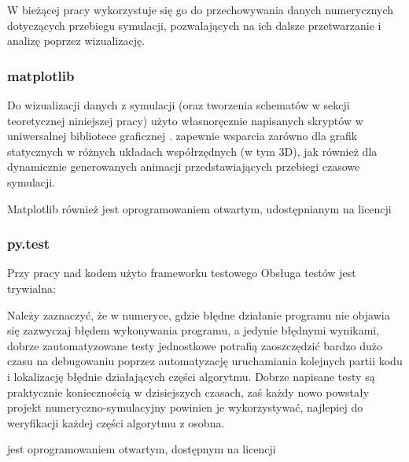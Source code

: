    W bieżącej pracy wykorzystuje się go do przechowywania danych numerycznych dotyczących
    przebiegu symulacji, pozwalających na ich dalsze przetwarzanie i analizę poprzez
    wizualizację.

    \subsubsection{matplotlib}
    Do wizualizacji danych z symulacji
    (oraz tworzenia schematów w sekcji teoretycznej niniejszej pracy)
    użyto własnoręcznie napisanych skryptów w uniwersalnej bibliotece graficznej
    .  zapewnie wsparcia zarówno
    dla grafik statycznych w różnych układach współrzędnych (w tym 3D), jak również dla
    dynamicznie generowanych animacji przedstawiających przebiegi czasowe symulacji.

    Matplotlib również jest oprogramowaniem otwartym, udostępnianym na licencji

    \subsubsection{py.test}
    Przy pracy nad kodem użyto frameworku testowego  
    Obsługa testów jest trywialna:


    Należy zaznaczyć, że w numeryce, gdzie błędne działanie programu nie objawia się
    zazwyczaj błędem wykonywania programu, a jedynie błędnymi wynikami, dobrze zautomatyzowane
    testy jednostkowe potrafią zaoszczędzić bardzo dużo czasu na debugowaniu
    poprzez automatyzację uruchamiania kolejnych partii kodu i lokalizację błędnie działających
    części algorytmu. Dobrze napisane testy są praktycznie koniecznością w dzisiejszych
    czasach, zaś każdy nowo powstały projekt numeryczno-symulacyjny powinien je
    wykorzystywać, najlepiej do weryfikacji każdej części algorytmu z osobna.

     jest oprogramowaniem otwartym, dostępnym na licencji 


